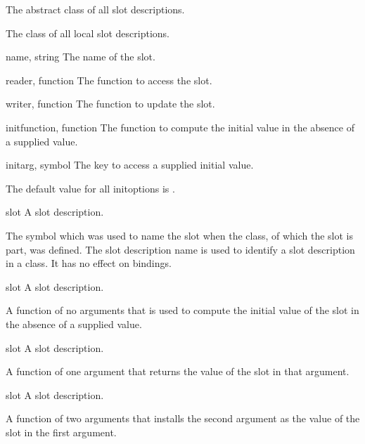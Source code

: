 %
\begin{optDefinition}

The abstract class of all slot descriptions.


The class of all local slot descriptions.
%
\begin{initoptions}
    \item[name, string] The name of the slot.%
    \item[reader, function] The function to access the slot.
    \item[writer, function] The function to update the slot.
    \item[initfunction, function] The function to compute the initial value in
    the absence of a supplied value.
    \item[initarg, symbol] The key to access a supplied initial value.
\end{initoptions}

The default value for all initoptions is \nil.

%
\begin{arguments}
    \item[slot] A slot description.
\end{arguments}
%
\result%
The symbol which was used to name the slot when the class, of which
the slot is part, was defined.
%
\remarks%
The slot description name is used to identify a slot description in a
class. It has no effect on bindings.

%
\begin{arguments}
    \item[slot] A slot description.
\end{arguments}
%
\result%
A function of no arguments that is used to compute the initial value of the
slot in the absence of a supplied value.

%
\begin{arguments}
    \item[slot] A slot description.
\end{arguments}
%
\result%
A function of one argument that returns the value of the slot
in that argument.

%
\begin{arguments}
    \item[slot] A slot description.
\end{arguments}
%
\result%
A function of two arguments that installs the second argument as the value of
the slot in the first argument.
\end{optDefinition}

